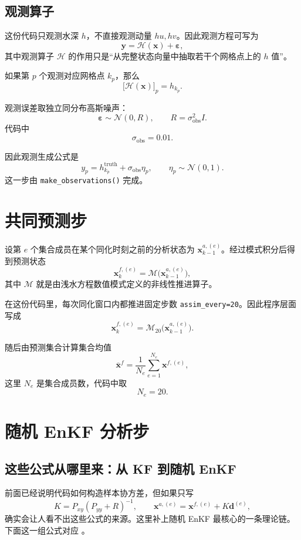 \documentclass[12pt,a4paper]{article}
\begin{document}
\subsection{观测算子}

这份代码只观测水深 $h$，不直接观测动量 $hu,hv$。因此观测方程可写为
\[
\mathbf{y} = \mathcal{H}(\mathbf{x}) + \boldsymbol{\varepsilon},
\]
其中观测算子 $\mathcal{H}$ 的作用只是“从完整状态向量中抽取若干个网格点上的 $h$ 值”。

如果第 $p$ 个观测对应网格点 $k_p$，那么
\[
\bigl[\mathcal{H}(\mathbf{x})\bigr]_p = h_{k_p}.
\]

观测误差取独立同分布高斯噪声：
\[
\boldsymbol{\varepsilon}\sim \mathcal{N}(0,R),
\qquad
R = \sigma_{\mathrm{obs}}^2 I.
\]
代码中
\[
\sigma_{\mathrm{obs}} = 0.01.
\]

因此观测生成公式是
\[
y_p = h^{\mathrm{truth}}_{k_p} + \sigma_{\mathrm{obs}}\eta_p,
\qquad
\eta_p\sim \mathcal{N}(0,1).
\]
这一步由 \texttt{make\_observations()} 完成。

\section{共同预测步}

设第 $e$ 个集合成员在某个同化时刻之前的分析状态为 $\mathbf{x}_{k-1}^{a,(e)}$。经过模式积分后得到预测状态
\[
\mathbf{x}_{k}^{f,(e)} = \mathcal{M}\bigl(\mathbf{x}_{k-1}^{a,(e)}\bigr),
\]
其中 $\mathcal{M}$ 就是由浅水方程数值模式定义的非线性推进算子。

在这份代码里，每次同化窗口内都推进固定步数 \texttt{assim\_every=20}。因此程序层面写成
\[
\mathbf{x}_{k}^{f,(e)} = \mathcal{M}_{20}\bigl(\mathbf{x}_{k-1}^{a,(e)}\bigr).
\]

随后由预测集合计算集合均值
\[
\bar{\mathbf{x}}^f = \frac{1}{N_e}\sum_{e=1}^{N_e}\mathbf{x}^{f,(e)},
\]
这里 $N_e$ 是集合成员数，代码中取
\[
N_e = 20.
\]

\section{随机 EnKF 分析步}

\subsection{这些公式从哪里来：从 KF 到随机 EnKF}

前面已经说明代码如何构造样本协方差，但如果只写
\[
K = P_{xy}(P_{yy}+R)^{-1},
\qquad
\mathbf{x}^{a,(e)}=\mathbf{x}^{f,(e)}+K\mathbf{d}^{(e)},
\]
确实会让人看不出这些公式的来源。这里补上随机 EnKF 最核心的一条理论链。下面这一组公式对应 \cite[Sec.~6.3, Eqs.~(6.3)--(6.11)]{asch2016data}。
\end{document}

